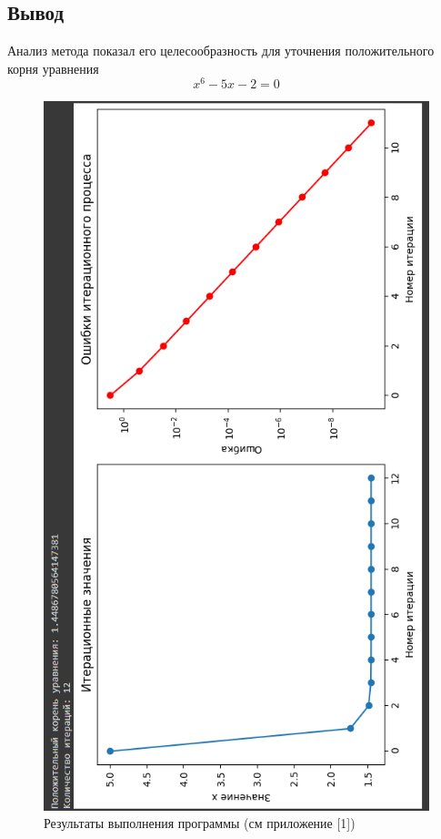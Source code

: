 \documentclass{article}
\begin{document}
	\subsection{Вывод}
	Анализ метода показал его целесообразность для уточнения положительного корня уравнения $$x^6-5x-2=0$$
	\begin{figure}
		\includegraphics{iterations2.png}
		\caption{Результаты выполнения программы (см приложение [1])}
	\end{figure}
	\newpage
\end{document}
